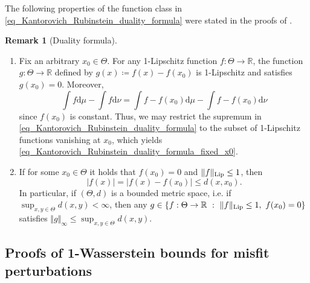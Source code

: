 \documentclass[a4paper]{scrartcl}
\theoremstyle{definition}
\newtheorem{remark}[theorem]{Remark}
\numberwithin{equation}{section}
\newcommand{\R}{\mathbb{R}}
\newcommand{\rd}{\mathrm{d}}
\newcommand{\abs}[1]{\vert #1\vert}
\newcommand{\norm}[1]{\Vert #1 \Vert}
\newcommand{\Lip}[0]{\textup{Lip}}
\begin{document}
The following properties of the function class in \eqref{eq_Kantorovich_Rubinstein_duality_formula} were stated in the proofs of \cite[Theorem 14, Theorem 15]{Sprungk2020}. 
\begin{remark}[Duality formula]
\label{remark_duality_formula}
\begin{enumerate}
\item \label{remark_duality_formula_item1} Fix an arbitrary $x_0\in\Theta$. 
 For any 1-Lipschitz function $f:\Theta\to\R$, the function $g:\Theta\to\R$ defined by $g(x)\coloneqq f(x)-f(x_0)$ is 1-Lipschitz and satisfies $g(x_0)=0$. Moreover, 
 \begin{equation*}
  \int f \rd \mu-\int f \rd \nu=\int f-f(x_0)\rd \mu-\int f-f(x_0)\rd \nu
 \end{equation*}
since $f(x_0)$ is constant. Thus, we may restrict the supremum in \eqref{eq_Kantorovich_Rubinstein_duality_formula} to the subset of 1-Lipschitz functions vanishing at $x_0$, which yields \eqref{eq_Kantorovich_Rubinstein_duality_formula_fixed_x0}.
\item \label{remark_duality_formula_item2} If for some $x_0\in\Theta$ it holds that $f(x_0)=0$ and $\norm{f}_{\Lip}\leq 1$, then 
\begin{equation}
 \label{eq_upper_bound_1_Lipschitz_function_by_metric}
 \abs{f(x)}=\abs{f(x)-f(x_0)}\leq d(x,x_0).
\end{equation}
In particular, if $(\Theta,d)$ is a bounded metric space, i.e. if $\sup_{x,y\in \Theta}d(x,y)<\infty$, then any $g\in\{f:\Theta\to\R\ :\ \norm{f}_{\Lip}\leq 1,\ f(x_0)=0\}$ satisfies $\norm{g}_{\infty}\leq \sup_{x,y\in \Theta}d(x,y)$.
\end{enumerate}
\end{remark}

\subsection{Proofs of 1-Wasserstein bounds for misfit perturbations}
\label{section_W1bounds_misfit_perturbations_proofs}
\end{document}
